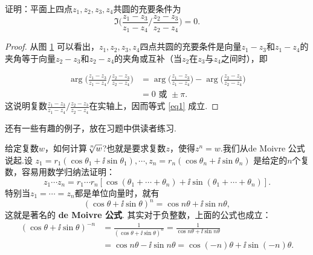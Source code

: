 \begin{example}
证明：平面上四点$z_1,z_2,z_3,z_4$共圆的充要条件为
\begin{equation}\label{eq1}
\Im\bigg(\frac{z_1-z_3}{z_1-z_4}\bigg/\frac{z_2-z_3}{z_2-z_4}\bigg)=0.
\end{equation}
\end{example}
\begin{proof}
从图 \ref{fig1.4} 可以看出，$z_1,z_2,z_3,z_4$四点共圆的充要条件是向量$z_1-z_3$和$z_1-z_4$的夹角等于向量$z_2-z_3$和$z_2-z_4$的夹角或互补（当$z_2$在$z_3$与$z_4$之间时），即
\begin{figure}
  \centering
\caption{\label{fig1.4}}
\end{figure}
\begin{align*}
\arg\bigg(\frac{z_1-z_3}{z_1-z_4}\bigg/\frac{z_2-z_3}{z_2-z_4}\bigg)
&=\arg\bigg(\frac{z_1-z_3}{z_1-z_4}\bigg)-\arg\bigg(\frac{z_2-z_3}{z_2-z_4}\bigg)\\
&=0\text{ 或 }\pm\pi.
\end{align*}
这说明复数$\frac{z_1-z_3}{z_1-z_4}\bigg/\frac{z_2-z_3}{z_2-z_4}$在实轴上，因而等式 \eqref{eq1} 成立.
\end{proof}


还有一些有趣的例子，放在习题中供读者练习.

给定复数$w$，如何计算$\sqrt[\leftroot{-1}\uproot{2} n]{w}$?也就是要求复数$z$，使得$z^n=w$.我们从de Moivre 公式说起.设
$z_1=r_1(\cos\theta_1+\ii\sin\theta_1),\cdots,z_n=r_n(\cos\theta_n+\ii\sin\theta_n)$
是给定的$n$个复数，容易用数学归纳法证明：
\[z_1\cdots z_n=r_1\cdots r_n[\cos(\theta_1+\cdots+\theta_n)+\ii\sin(\theta_1+\cdots+\theta_n)].\]
特别当$z_1=\cdots=z_n$都是单位向量时，就有
\[(\cos\theta+\ii\sin\theta)^n=\cos n\theta+\ii\sin n\theta,\]
这就是著名的 \textbf{de Moivre 公式}. 其实对于负整数，上面的公式也成立：
\begin{align*}
(\cos\theta+\ii\sin\theta)^{-n}&=\frac1{(\cos\theta+\ii\sin\theta)^n}
=\frac1{\cos n\theta+\ii\sin n\theta}\\
&=\cos n\theta-\ii\sin n\theta=\cos(-n)\theta+\ii\sin(-n)\theta.
\end{align*}

